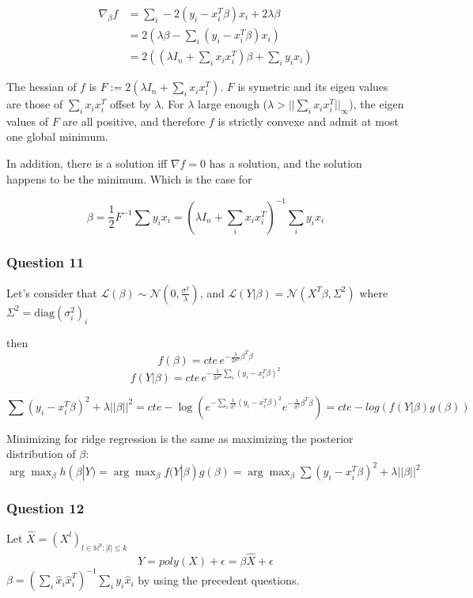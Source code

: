 \documentclass[12pt]{article}
\newcommand{\Q}[1]{\subsubsection*{Question #1}}
\begin{document}
\begin{itemize}
\begin{align}
\nabla_{\beta} f &= \sum_i -2 (y_i - x_i^T \beta) x_i + 2 \lambda \beta \\
&= 2 ( \lambda \beta - \sum_i(y_i - x_i^T \beta) x_i)\\
&= 2 ( (\lambda I_n + \sum_i x_i x_i^T) \beta + \sum_i y_i x_i)
\end{align}

The hessian of $f$ is $F := 2(\lambda I_n + \sum_i x_i x_i^T)$. $F$ is symetric and its eigen values are those of $\sum_i x_i x_i^T$ offset by $\lambda$. For $\lambda$ large enough ($\lambda > ||\sum_i x_i x_i^T||_{\infty}$), the eigen values of $F$ are all positive, and therefore $f$ is strictly convexe and admit at most one global minimum.

In addition, there is a solution iff $\nabla f = 0$ has a solution, and the solution happens to be the minimum. Which is the case for 

$$\beta = \frac12 F^{-1} \sum y_i x_i = (\lambda I_n + \sum_i x_i x_i^T)^{-1} \sum_i y_i x_i$$


\Q{11}

Let's consider that $\mathcal L(\beta) \sim \mathcal N (0, \frac{\sigma^2}{\lambda})$, and $\mathcal L (Y | \beta) = \mathcal N(X^T \beta, \Sigma^2) $ where 
$\Sigma^2 = \text{diag}(\sigma^2_i)_i$


then
$$f(\beta) = cte \, e^{-\frac{\lambda}{2\sigma^2} \beta^T \beta}$$
$$f(Y | \beta) = cte \, e^{-\frac{1}{2\sigma^2} \sum_i (y_i - x_i^T \beta)^2}$$


$$\sum (y_i - x_i^T \beta)^2 + \lambda ||\beta||^2 = cte  -\log( e^{-\sum_i \frac1 {\sigma^2}(y_i - x_i^T \beta)^2} e^{-\frac{\lambda}{\sigma^2} \beta^T \beta}) = cte -log( f(Y | \beta) g(\beta) )$$




Minimizing for ridge regression is the same as maximizing the posterior distribution of $\beta$: $\arg\max_{\beta} h(\beta|Y) = \arg\max_{\beta} f(Y | \beta) g(\beta) =  \arg\max_{\beta} \sum (y_i - x_i^T \beta)^2 + \lambda ||\beta||^2$

\Q{12}

Let $\hat X = (X^l)_{l \in \mathbb{N}^p: |l| \leq k}$
$$Y = poly(X) + \epsilon = \beta \hat X + \epsilon$$
$\beta = (\sum_i \hat x_i \hat x_i^T)^{-1} \sum_i y_i \hat x_i$
by using the precedent questions.
\end{itemize}
\end{document}
